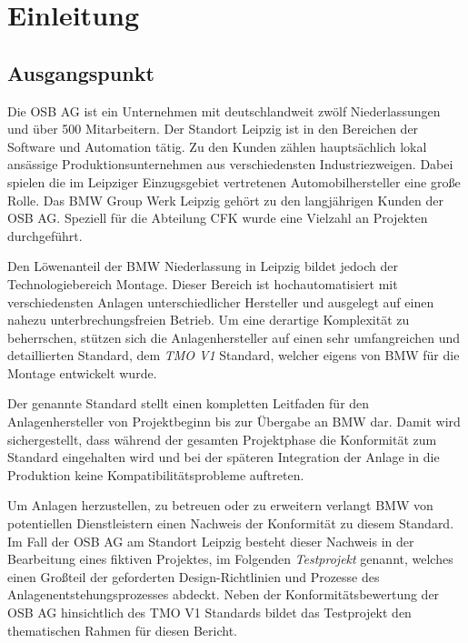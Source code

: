 


\chapter{Einleitung}
\label{chap:intro}

\section{Ausgangspunkt}

Die OSB AG ist ein Unternehmen mit deutschlandweit zwölf Niederlassungen und über 500 Mitarbeitern. Der Standort Leipzig ist in den Bereichen der Software und Automation tätig. Zu den Kunden zählen hauptsächlich lokal ansässige Produktionsunternehmen aus verschiedensten Industriezweigen. Dabei spielen die im Leipziger Einzugsgebiet vertretenen Automobilhersteller eine große Rolle.
Das BMW Group Werk Leipzig gehört zu den langjährigen Kunden der OSB AG. Speziell für die Abteilung CFK wurde eine Vielzahl an Projekten durchgeführt.

Den Löwenanteil der BMW Niederlassung in Leipzig bildet jedoch der Technologiebereich Montage. Dieser Bereich ist hochautomatisiert mit verschiedensten Anlagen unterschiedlicher Hersteller und ausgelegt auf einen nahezu unterbrechungsfreien Betrieb. Um eine derartige Komplexität zu beherrschen, stützen sich die Anlagenhersteller auf einen sehr umfangreichen und detaillierten Standard, dem \emph{TMO V1} Standard, welcher eigens von BMW für die Montage entwickelt wurde.

Der genannte Standard stellt einen kompletten Leitfaden für den Anlagenhersteller von Projektbeginn bis zur Übergabe an BMW dar. Damit wird sichergestellt, dass während der gesamten Projektphase die Konformität zum Standard eingehalten wird und bei der späteren Integration der Anlage in die Produktion keine Kompatibilitätsprobleme auftreten.

Um Anlagen herzustellen, zu betreuen oder zu erweitern verlangt BMW von potentiellen Dienstleistern einen Nachweis der Konformität zu diesem Standard. Im Fall der OSB AG am Standort Leipzig besteht dieser Nachweis in der Bearbeitung eines fiktiven Projektes, im Folgenden \emph{Testprojekt} genannt, welches einen Großteil der geforderten Design-Richtlinien und Prozesse des Anlagenentstehungsprozesses abdeckt. Neben der Konformitätsbewertung der OSB AG hinsichtlich des TMO V1 Standards bildet das Testprojekt den thematischen Rahmen für diesen Bericht.

